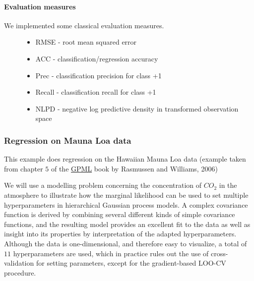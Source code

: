 \documentclass[letterpaper,10pt,english]{sphinxmanual}
\begin{document}
\paragraph{Evaluation measures}
\label{CV:evaluation-measures}\begin{description}
\item[{We implemented some classical evaluation measures.}] \leavevmode\begin{itemize}
\item {} 
RMSE - root mean squared error

\item {} 
ACC - classification/regression accuracy

\item {} 
Prec - classification precision for class +1

\item {} 
Recall - classification recall for class +1

\item {} 
NLPD - negative log predictive density in transformed observation space

\end{itemize}

\end{description}


\subsubsection{Regression on Mauna Loa data}
\label{demoMaunaLoa:regression-on-mauna-loa-data}\label{demoMaunaLoa::doc}
This example does regression on the Hawaiian Mauna Loa data (example taken from chapter $5$ of the \href{http://www.gaussianprocess.org/gpml/chapters/RW5.pdf}{GPML} book by Rasmussen and Williams, 2006)

We will use a modelling problem concerning the concentration of $CO_2$
in the atmosphere to illustrate how the marginal likelihood can be used to set multiple
hyperparameters in hierarchical Gaussian process models. A complex covariance function
is derived by combining several different kinds of simple covariance
functions, and the resulting model provides an excellent fit to the data as well
as insight into its properties by interpretation of the adapted hyperparameters. Although the data is
one-dimensional, and therefore easy to visualize, a
total of $11$ hyperparameters are used, which in practice rules out the use of
cross-validation for setting parameters, except for the gradient-based LOO-CV procedure.
\end{document}
